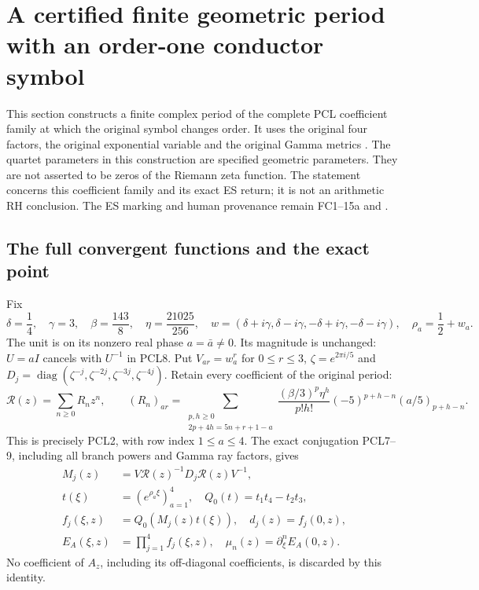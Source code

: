 \section{A certified finite geometric period with an order-one conductor symbol}
\label{sec:finite-period-zero}

This section constructs a finite complex period of the complete PCL
coefficient family \cite{PCLOriginal} at which the original symbol changes order.
It uses the original four factors, the original exponential variable and
the original Gamma metrics \cite{WCF}. The quartet parameters in this
construction are specified geometric parameters. They are not asserted
to be zeros of the Riemann zeta function. The statement concerns this
coefficient family and its exact ES return; it is not an arithmetic RH
conclusion. The ES marking and human provenance remain FC1--15a and
\cite{ES488}.

\subsection{The full convergent functions and the exact point}
Fix
\[
 \delta=\frac14,\quad\gamma=3,\quad
 \beta=\frac{143}{8},\quad\eta=\frac{21025}{256},\quad
 w=(\delta+i\gamma,\delta-i\gamma,-\delta+i\gamma,-\delta-i\gamma),
 \quad\rho_a=\frac12+w_a.
 \tag{FPZ1}
\]
The unit is on its nonzero real phase $a=\bar a\ne0$. Its magnitude is
unchanged: $U=aI$ cancels with $U^{-1}$ in PCL8. Put
$V_{ar}=w_a^r$ for $0\le r\le3$, $\zeta=e^{2\pi i/5}$ and
$D_j=\operatorname{diag}(\zeta^{-j},\zeta^{-2j},\zeta^{-3j},\zeta^{-4j})$.
Retain every coefficient of the original period:
\[
 \mathcal R(z)=\sum_{n\ge0}R_nz^n,\qquad
 (R_n)_{ar}=\sum_{\substack{p,h\ge0\\2p+4h=5n+r+1-a}}
 \frac{(\beta/3)^p\eta^h}{p!h!}(-5)^{p+h-n}(a/5)_{p+h-n}.
 \tag{FPZ2}
\]
This is precisely PCL2, with row index $1\le a\le4$. The exact
conjugation PCL7--9, including all branch powers and Gamma ray factors,
gives
\[
 \begin{split}
 M_j(z)&=V\mathcal R(z)^{-1}D_j\mathcal R(z)V^{-1},\\
 t(\xi)&=(e^{\rho_a\xi})_{a=1}^4,\quad Q_0(t)=t_1t_4-t_2t_3,\\
 f_j(\xi,z)&=Q_0(M_j(z)t(\xi)),\quad d_j(z)=f_j(0,z),\\
 E_A(\xi,z)&=\prod_{j=1}^4f_j(\xi,z),\quad
 \mu_n(z)=\partial_\xi^n E_A(0,z).
 \end{split}\tag{FPZ3}
\]
No coefficient of $A_z$, including its off-diagonal coefficients, is
discarded by this identity.

